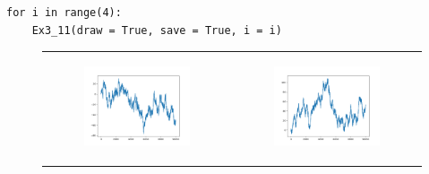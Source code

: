 \documentclass{article}
\begin{document}
\begin{enumerate}
\begin{enumerate}
\begin{itemize}
\begin{verbatim}
for i in range(4):
    Ex3_11(draw = True, save = True, i = i)
\end{verbatim}
\begin{figure}
  \centering
  \begin{tabular}{cc}
    \begin{subfigure}{0.45\linewidth}
      \centering
      \includegraphics[width=\linewidth]{3-Expectation/Ex3_11-0.png}
      \caption{}
    \end{subfigure}
    &
    \begin{subfigure}{0.45\linewidth}
      \centering
      \includegraphics[width=\linewidth]{3-Expectation/Ex3_11-1.png}
      \caption{}
    \end{subfigure}
    \\

\end{tabular}
\end{figure}
\end{itemize}
\end{enumerate}
\end{enumerate}
\end{document}

